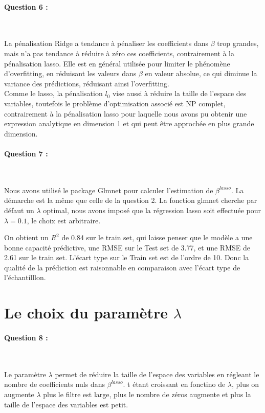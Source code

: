 \documentclass{article}
\begin{document}
	\paragraph{Question 6 :}
	~\par
	
	La pénalisation Ridge a tendance à pénaliser les coefficients dans $\beta$ trop grandes, mais n'a pas tendance à réduire à zéro ces coefficients, contrairement à la pénalisation lasso. Elle est en général utilisée pour limiter le phénomène d'overfitting, en réduisant les valeurs dans $\beta$ en valeur absolue, ce qui diminue la variance des prédictions, réduisant ainsi l'overfitting.
	\\Comme le lasso, la pénalisation $l_{0}$ vise aussi à réduire la taille de l'espace des variables, toutefois le problème d'optimisation associé est NP complet, contrairement à la pénalisation lasso pour laquelle nous avons pu obtenir une expression analytique en dimension 1 et qui peut être approchée en plus grande dimension.

	\paragraph{Question 7 :}
	~\par
	
	Nous avons utilisé le package Glmnet pour calculer l'estimation de $\beta^{lasso}$. La démarche est la même que celle de la question 2. La fonction glmnet cherche par défaut un $\lambda$ optimal, nous avons imposé que la régression lasso soit effectuée pour $\lambda=0.1$, le choix est arbitraire.
	
	On obtient un $R^{2}$ de 0.84 sur le train set, qui laisse penser que le modèle a une bonne capacité prédictive, une RMSE sur le Test set de 3.77, et une RMSE de 2.61 sur le train set. L'écart type sur le Train set est de l'ordre de 10. Donc la qualité de la prédiction est raisonnable en comparaison avec l'écart type de l'échantilllon. 
	
	
	\section{Le choix du paramètre $\lambda$}
	
	\paragraph{Question 8 :}
	~\par
	
	Le paramètre $\lambda$ permet de réduire la taille de l'espace des variables en régleant le nombre de coefficients nuls dans $\beta^{lasso}$. t étant croissant en fonctino de $\lambda$, plus on augmente $\lambda$ plus le filtre est large, plus le nombre de zéros augmente et plus la taille de l'espace des variables est petit.
	
\end{document}
